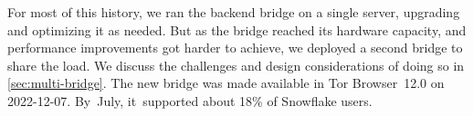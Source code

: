 \documentclass[letterpaper,twocolumn]{article}
\begin{document}
For most of this history,
we ran the backend bridge on a single server,
upgrading and optimizing it as needed.
But as the bridge reached its hardware capacity,
and performance improvements got harder to achieve,
we deployed a second bridge to share the load.
We discuss the challenges and design considerations of doing so in \autoref{sec:multi-bridge}.
The new bridge was made available in
Tor Browser~12.0 on \mbox{2022-12-07}.
By~July, it~supported about 18\% of Snowflake users.
\end{document}
